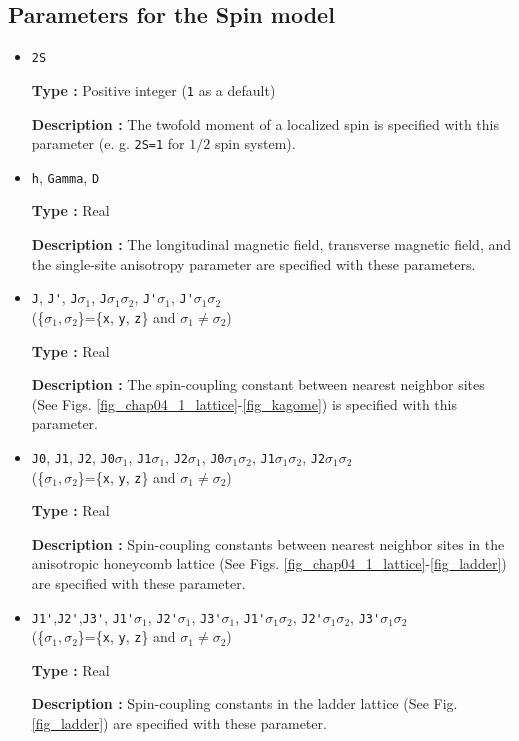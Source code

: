 \subsection{Parameters for the Spin model}
\begin{itemize}
\item \verb|2S|

{\bf Type :} Positive integer (\verb|1| as a default)

{\bf Description :} The twofold moment of a localized spin is specified 
with this parameter (e. g. \verb|2S=1| for $1/2$ spin system). 

\item \verb|h|, \verb|Gamma|, \verb|D|

{\bf Type :} Real

{\bf Description :} The longitudinal magnetic field, transverse magnetic field, 
and the single-site anisotropy parameter are specified with these parameters.

\item \verb|J|, \verb|J'|, \verb|J|$\sigma_1$, \verb|J|$\sigma_1\sigma_2$,  \verb|J'|$\sigma_1$, \verb|J'|$\sigma_1\sigma_2$\\
  (\{${\sigma_1, \sigma_2}$\}=\{\verb|x|, \verb|y|, \verb|z|\} and ${\sigma_1\neq \sigma_2}$)

{\bf Type :} Real

{\bf Description :} The spin-coupling constant between nearest neighbor sites
(See Figs. \ref{fig_chap04_1_lattice}-\ref{fig_kagome}) is specified with this parameter.

\item \verb|J0|, \verb|J1|, \verb|J2|, \verb|J0|$\sigma_1$, \verb|J1|$\sigma_1$, \verb|J2|$\sigma_1$,
 \verb|J0|${\sigma_1\sigma_2}$, \verb|J1|${\sigma_1\sigma_2}$, \verb|J2|${\sigma_1\sigma_2}$ \\
  (\{${\sigma_1, \sigma_2}$\}=\{\verb|x|, \verb|y|, \verb|z|\} and ${\sigma_1\neq \sigma_2}$)

{\bf Type :} Real

{\bf Description :} Spin-coupling constants between nearest neighbor sites
in the anisotropic honeycomb lattice
(See Figs. \ref{fig_chap04_1_lattice}-\ref{fig_ladder}) are specified with these parameter.

\item \verb|J1'|,\verb|J2'|,\verb|J3'|,  \verb|J1'|$\sigma_1$, \verb|J2'|$\sigma_1$, \verb|J3'|$\sigma_1$,
\verb|J1'|${\sigma_1\sigma_2}$, \verb|J2'|${\sigma_1\sigma_2}$, \verb|J3'|${\sigma_1\sigma_2}$\\
 (\{${\sigma_1, \sigma_2}$\}=\{\verb|x|, \verb|y|, \verb|z|\} and ${\sigma_1\neq \sigma_2}$)

{\bf Type :} Real

{\bf Description :} Spin-coupling constants in the ladder lattice
(See Fig. \ref{fig_ladder}) are specified with these parameter.

\end{itemize}


